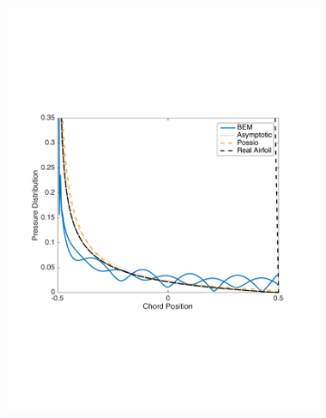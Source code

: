 \documentclass{article}
\begin{document}
\begin{figure}[h]
\centering
\begin{subfigure}{0.3\textwidth}
	\centering
	\includegraphics[width = \textwidth, height=0.2\textheight]{pressure_k20mag}
\end{subfigure}%
\begin{subfigure}{0.3\textwidth}
	\centering

\end{subfigure}
\end{figure}
\end{document}
